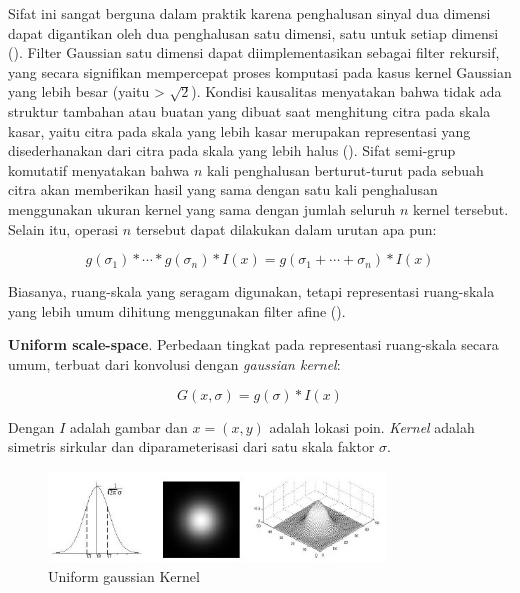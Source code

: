 Sifat ini sangat berguna dalam praktik karena penghalusan sinyal dua dimensi dapat digantikan oleh dua penghalusan satu dimensi, satu untuk setiap dimensi (\cite[hlm. 92]{Lowe2004}). 
Filter Gaussian satu dimensi dapat diimplementasikan sebagai filter rekursif, yang secara signifikan mempercepat proses 
komputasi pada kasus kernel Gaussian yang lebih besar (yaitu > \( \sqrt{2}\)). 
Kondisi kausalitas menyatakan bahwa tidak ada struktur tambahan atau buatan yang dibuat saat menghitung citra pada skala kasar, 
yaitu citra pada skala yang lebih kasar merupakan representasi yang disederhanakan dari citra pada skala yang lebih halus (\cite[hlm. 13--14]{mikolajczyk:tel-00584096}). 
Sifat semi-grup komutatif menyatakan bahwa \(n\) kali penghalusan berturut-turut pada sebuah citra akan memberikan hasil yang sama dengan satu kali penghalusan menggunakan ukuran kernel yang sama dengan jumlah seluruh \(n\) kernel tersebut. 
Selain itu, operasi \(n\) tersebut dapat dilakukan dalam urutan apa pun:

\begin{equation*}
g(\sigma_{1}) * \cdots * g(\sigma_{n}) * I(x) = g(\sigma_{1} + \cdots + \sigma_{n}) * I(x)
\end{equation*}

Biasanya, ruang-skala yang seragam digunakan, tetapi representasi ruang-skala yang lebih umum dihitung menggunakan filter afine (\cite[hlm. 14--15]{mikolajczyk:tel-00584096}).

\textbf{Uniform scale-space}. Perbedaan tingkat pada representasi ruang-skala secara umum, terbuat dari konvolusi dengan \emph{gaussian kernel}:

\begin{equation}
G(x,\sigma) = g(\sigma) * I(x)
\label{eq:konvolusi}
\end{equation}

Dengan \(I\) adalah gambar dan \(x = (x,y)\) adalah lokasi poin.
\emph{Kernel} adalah simetris sirkular dan diparameterisasi dari satu skala faktor \(\sigma \).

\begin{figure}
  \centering{}
  \includegraphics[width=0.8\textwidth]{gambar/Uniform Gaussian kernel.jpg}
  \caption{Uniform gaussian Kernel}
\end{figure}

